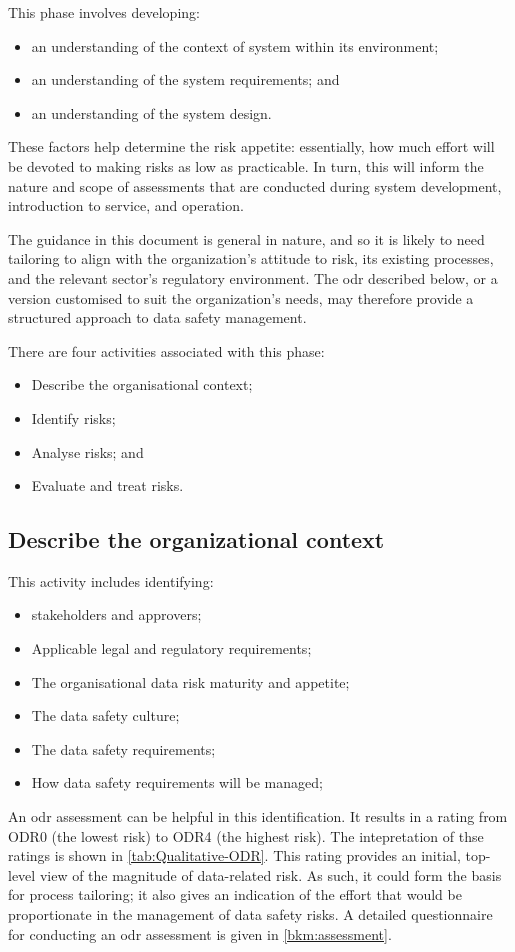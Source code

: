 This phase involves developing:
\begin{itemize}
	\item an understanding of the context of system within its environment; 
	\item an understanding of the system requirements; and 
	\item an understanding of the system design.
\end{itemize}

These factors help determine the risk appetite: essentially, how much effort will be devoted to making risks as low as practicable. In turn, this will inform the nature and scope of assessments that are conducted during system development, introduction to service, and operation.

The guidance in this document is general in nature, and so it is likely to need \gls{tailoring} to align with the organization's attitude to risk, its existing processes, and the relevant sector's regulatory environment. The \gls{odr} described below, or a version customised to suit the organization's needs, may therefore provide a structured approach to data safety management.

There are four activities associated with this phase:
\begin{itemize}
	\item Describe the organisational context;
	\item Identify risks;
	\item Analyse risks; and
	\item Evaluate and treat risks.
\end{itemize}

\subsection{Describe the organizational context}
This activity includes identifying:
\begin{itemize}
	\item \Glspl{stakeholder} and approvers;
	\item Applicable legal and regulatory requirements;
	\item The organisational data risk maturity and appetite;
	\item The data safety culture;
	\item The \glspl{data safety requirement};
	\item How \glspl{data safety requirement} will be managed;
\end{itemize}
An \gls{odr} assessment can be helpful in this identification. It results in a rating from ODR0 (the lowest risk) to ODR4 (the highest risk). The intepretation of thse ratings is shown in \ref{tab:Qualitative-ODR}. This rating provides an initial, top-level view of the magnitude of data-related risk. As such, it could form the basis for process \gls{tailoring}; it also gives an indication of the effort that would be proportionate in the management of data safety risks. A detailed questionnaire for conducting an \gls{odr} assessment is given in \ref{bkm:assessment}. 

